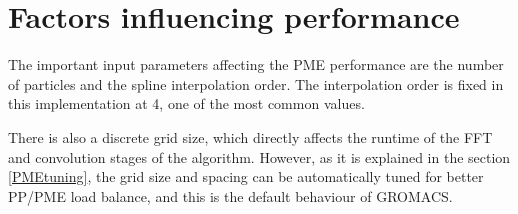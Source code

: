 \documentclass[12pt,a4paper]{report}
\newcommand{\draft}[1]{#1}
\begin{document}
\section{Factors influencing performance}

The important input parameters affecting the PME performance are the number of particles and the spline interpolation order.
The interpolation order is fixed in this implementation at 4, one of the most common values.


There is also a discrete grid size, which directly affects the runtime of the FFT and convolution stages of the algorithm. However, as it is explained in the section \ref{PMEtuning}, the grid size and spacing can be automatically tuned for better PP/PME load balance, and this is the default behaviour of GROMACS. 





\end{document}
